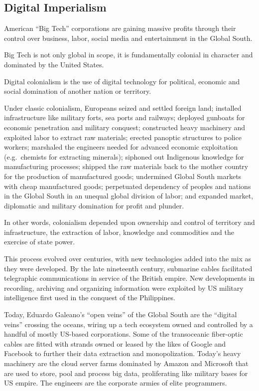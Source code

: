 \documentclass[
]{book}
\begin{document}
\hypertarget{digital-imperialism}{%
\subsection{Digital Imperialism}\label{digital-imperialism}}

American ``Big Tech'' corporations are gaining massive profits through their control over business, labor, social media and entertainment in the Global South.

Big Tech is not only global in scope, it is fundamentally colonial in character and dominated by the United States.

Digital colonialism is the use of digital technology for political, economic and social domination of another nation or territory.

Under classic colonialism, Europeans seized and settled foreign land; installed infrastructure like military forts, sea ports and railways; deployed gunboats for economic penetration and military conquest; constructed heavy machinery and exploited labor to extract raw materials; erected panoptic structures to police workers; marshaled the engineers needed for advanced economic exploitation (e.g.~chemists for extracting minerals); siphoned out Indigenous knowledge for manufacturing processes; shipped the raw materials back to the mother country for the production of manufactured goods; undermined Global South markets with cheap manufactured goods; perpetuated dependency of peoples and nations in the Global South in an unequal global division of labor; and expanded market, diplomatic and military domination for profit and plunder.

In other words, colonialism depended upon ownership and control of territory and infrastructure, the extraction of labor, knowledge and commodities and the exercise of state power.

This process evolved over centuries, with new technologies added into the mix as they were developed. By the late nineteenth century, submarine cables facilitated telegraphic communications in service of the British empire. New developments in recording, archiving and organizing information were exploited by US military intelligence first used in the conquest of the Philippines.

Today, Eduardo Galeano's ``open veins'' of the Global South are the ``digital veins'' crossing the oceans, wiring up a tech ecosystem owned and controlled by a handful of mostly US-based corporations. Some of the transoceanic fiber-optic cables are fitted with strands owned or leased by the likes of Google and Facebook to further their data extraction and monopolization. Today's heavy machinery are the cloud server farms dominated by Amazon and Microsoft that are used to store, pool and process big data, proliferating like military bases for US empire. The engineers are the corporate armies of elite programmers.
\end{document}
